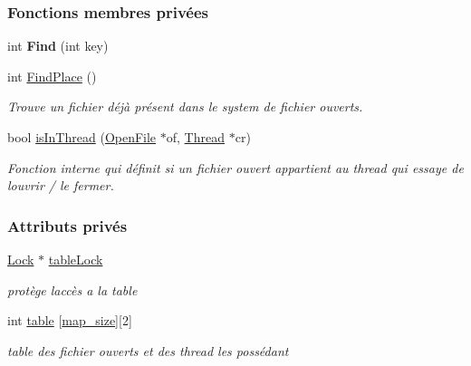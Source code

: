 \subsubsection*{Fonctions membres privées}
\begin{DoxyCompactItemize}
\item 
\hypertarget{class_file_map_a2bc0f5e08a5fd6d715063429f4649071}{}\label{class_file_map_a2bc0f5e08a5fd6d715063429f4649071} 
int {\bfseries Find} (int key)
\item 
int \hyperlink{class_file_map_aead6784e56bc36eedd7aa16af522cb6e}{Find\+Place} ()
\begin{DoxyCompactList}\small\item\em Trouve un fichier déjà présent dans le system de fichier ouverts. \end{DoxyCompactList}\item 
bool \hyperlink{class_file_map_abd72d5b1fe0d70f1250bbde70773af20}{is\+In\+Thread} (\hyperlink{class_open_file}{Open\+File} $\ast$of, \hyperlink{class_thread}{Thread} $\ast$cr)
\begin{DoxyCompactList}\small\item\em Fonction interne qui définit si un fichier ouvert appartient au thread qui essaye de l\textquotesingle{}ouvrir / le fermer. \end{DoxyCompactList}\end{DoxyCompactItemize}
\subsubsection*{Attributs privés}
\begin{DoxyCompactItemize}
\item 
\hypertarget{class_file_map_a05268c86590f56c99aa67e320dcc5a8f}{}\label{class_file_map_a05268c86590f56c99aa67e320dcc5a8f} 
\hyperlink{class_lock}{Lock} $\ast$ \hyperlink{class_file_map_a05268c86590f56c99aa67e320dcc5a8f}{table\+Lock}
\begin{DoxyCompactList}\small\item\em protège l\textquotesingle{}accès a la table \end{DoxyCompactList}\item 
\hypertarget{class_file_map_a7b03ef9b23dbecbc48124f1d66555cb2}{}\label{class_file_map_a7b03ef9b23dbecbc48124f1d66555cb2} 
int \hyperlink{class_file_map_a7b03ef9b23dbecbc48124f1d66555cb2}{table} \mbox{[}\hyperlink{class_file_map_af5bd9ace733c982f93ab41ab482d90d0}{map\+\_\+size}\mbox{]}\mbox{[}2\mbox{]}
\begin{DoxyCompactList}\small\item\em table des fichier ouverts et des thread les possédant \end{DoxyCompactList}\end{DoxyCompactItemize}


